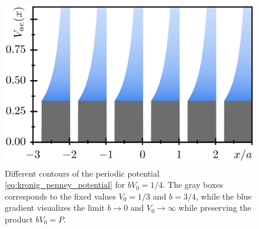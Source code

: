 \documentclass{svmono}
\begin{document}
\begin{figure}
    \centering
    \includegraphics{figures/kronig_penney_potential.png}
    \caption{Different contours of the periodic potential \cref{eq:kronig_penney_potential} for $bV_0=1/4$. The gray boxes corresponds to the fixed values $V_0=1/3$ and $b=3/4$, while the blue gradient visualizes the limit $b\rightarrow0$ and $V_0\rightarrow\infty$ while preserving the product $bV_0=P$.}
    \label{fig:kronig_penney_potential}
\end{figure}
\end{document}
